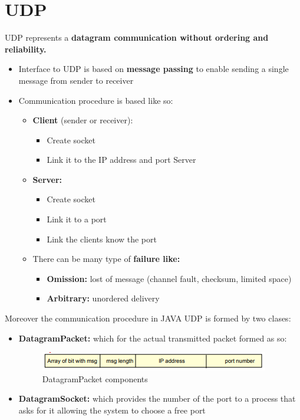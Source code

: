 \section{UDP}
UDP represents a \textbf{datagram communication without ordering and reliability.} 
\begin{itemize}
    \item Interface to UDP is based on \textbf{message passing} to enable sending a single message from sender to receiver
    \item Communication procedure is based like so:
        \begin{itemize}
            \item \textbf{Client} (sender or receiver):
                \begin{itemize}
                    \item Create socket
                    \item Link it to the IP address and port Server
                \end{itemize}
            \item \textbf{Server:}
                \begin{itemize}
                    \item Create socket
                    \item Link it to a port
                    \item Link the clients know the port 
                \end{itemize}
            \item There can be many type of \textbf{failure like:}
                \begin{itemize}
                    \item \textbf{Omission:} lost of message (channel fault, checksum, limited space)
                    \item \textbf{Arbitrary:} unordered delivery
                \end{itemize}
        \end{itemize}
\end{itemize}
Moreover the communication procedure in JAVA UDP is formed by two clases:
\begin{itemize}
    \item \textbf{DatagramPacket:} which for the actual transmitted packet formed as so:
    
    \begin{figure}[!h]
    \centering
    \includegraphics[width=.7\linewidth]{images/InterprocessCommunicationImplementationDesign/datagrampacket.png}
    \caption{DatagramPacket components}
\end{figure}
    
    \item \textbf{DatagramSocket:} which provides the number of the port to a process that asks for it allowing the system to choose a free port
\end{itemize}
